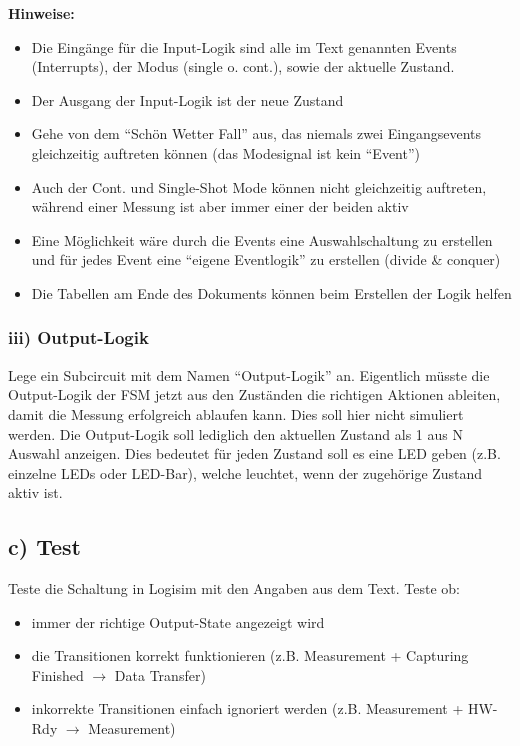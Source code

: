 \documentclass[a4paper]{scrartcl}
\begin{document}
\textbf{Hinweise:}
\begin{itemize}
  \item Die Eingänge für die Input-Logik sind alle im Text genannten Events (Interrupts), der Modus (single o. cont.), sowie der aktuelle Zustand.
  \item Der Ausgang der Input-Logik ist der neue Zustand
  \item Gehe von dem ``Schön Wetter Fall'' aus, das niemals zwei Eingangsevents gleichzeitig auftreten können (das Modesignal ist kein ``Event'')
  \item Auch der Cont. und Single-Shot Mode können nicht gleichzeitig auftreten, während einer Messung ist aber immer einer der beiden aktiv
  \item Eine Möglichkeit wäre durch die Events eine Auswahlschaltung zu erstellen und für jedes Event eine ``eigene Eventlogik'' zu erstellen (divide \& conquer)
  \item Die Tabellen am Ende des Dokuments können beim Erstellen der Logik helfen 
\end{itemize}


\subsubsection*{iii) Output-Logik}
Lege ein Subcircuit mit dem Namen ``Output-Logik'' an. Eigentlich müsste die Output-Logik der 
FSM jetzt aus den Zuständen die richtigen Aktionen ableiten, damit die Messung erfolgreich ablaufen kann.
Dies soll hier nicht simuliert werden. Die Output-Logik soll lediglich den aktuellen Zustand als 1 aus N Auswahl anzeigen.
Dies bedeutet für jeden Zustand soll es eine LED geben (z.B. einzelne LEDs oder LED-Bar), welche leuchtet, wenn der
zugehörige Zustand aktiv ist.

\subsection*{c) Test}
Teste die Schaltung in Logisim mit den Angaben aus dem Text. Teste ob:
\begin{itemize}
  \item immer der richtige Output-State angezeigt wird
  \item die Transitionen korrekt funktionieren (z.B. Measurement + Capturing Finished $\rightarrow$ Data Transfer)
  \item inkorrekte Transitionen einfach ignoriert werden (z.B. Measurement + HW-Rdy $\rightarrow$ Measurement)
\end{itemize}
\end{document}
